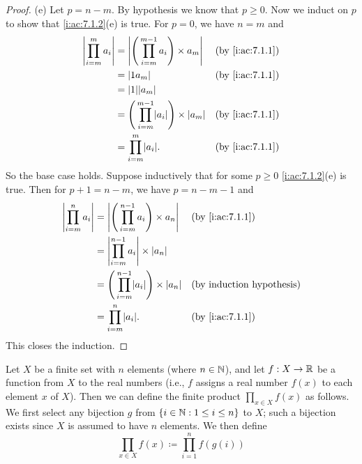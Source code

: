 \begin{proof}{(e)}
  Let \(p = n - m\).
  By hypothesis we know that \(p \geq 0\).
  Now we induct on \(p\) to show that \cref{i:ac:7.1.2}(e) is true.
  For \(p = 0\), we have \(n = m\) and
  \begin{align*}
    \abs{\prod_{i = m}^m a_i} & = \abs{\Bigg(\prod_{i = m}^{m - 1} a_i\Bigg) \times a_m}       &  & \by{i:ac:7.1.1} \\
                              & = \abs{1a_m}                                                   &  & \by{i:ac:7.1.1} \\
                              & = \abs{1}\abs{a_m}                                                                  \\
                              & = \Bigg(\prod_{i = m}^{m - 1} \abs{a_i}\Bigg) \times \abs{a_m} &  & \by{i:ac:7.1.1} \\
                              & = \prod_{i = m}^m \abs{a_i}.                                   &  & \by{i:ac:7.1.1}
  \end{align*}
  So the base case holds.
  Suppose inductively that for some \(p \geq 0\) \cref{i:ac:7.1.2}(e) is true.
  Then for \(p + 1 = n - m\), we have \(p = n - m - 1\) and
  \begin{align*}
    \abs{\prod_{i = m}^n a_i} & = \abs{\Bigg(\prod_{i = m}^{n - 1} a_i\Bigg) \times a_n}       &  & \by{i:ac:7.1.1} \\
                              & = \abs{\prod_{i = m}^{n - 1} a_i} \times \abs{a_n}                                  \\
                              & = \Bigg(\prod_{i = m}^{n - 1} \abs{a_i}\Bigg) \times \abs{a_n} &  & \byIH           \\
                              & = \prod_{i = m}^n \abs{a_i}.                                   &  & \by{i:ac:7.1.1}
  \end{align*}
  This closes the induction.
\end{proof}

\begin{ac}\label{i:ac:7.1.3}
  Let \(X\) be a finite set with \(n\) elements (where \(n \in \mathbb{N}\)), and let \(f : X \to \mathbb{R}\) be a function from \(X\) to the real numbers
  (i.e., \(f\) assigns a real number \(f(x)\) to each element \(x\) of \(X\)).
  Then we can define the finite product \(\prod_{x \in X} f(x)\) as follows.
  We first select any bijection \(g\) from \(\left\lbrace i \in \mathbb{N} : 1 \leq i \leq n\right\rbrace\) to \(X\);
  such a bijection exists since \(X\) is assumed to have \(n\) elements.
  We then define
  \[
    \prod_{x \in X} f(x) \coloneqq \prod_{i = 1}^n f(g(i))
  \]
\end{ac}

